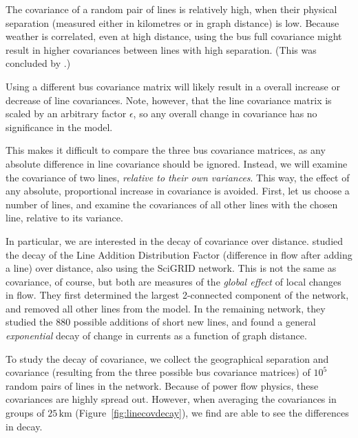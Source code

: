 \documentclass[main.tex]{subfiles}
\begin{document}
The covariance of a random pair of lines is relatively high, when their physical separation (measured either in kilometres or in graph distance) is low. Because weather is correlated, even at high distance, using the bus full covariance might result in higher covariances between lines with high separation. (This was concluded by \cite{Nesti2018emergentfailures}.) 

Using a different bus covariance matrix will likely result in a overall increase or decrease of line covariances. Note, however, that the line covariance matrix is scaled by an arbitrary factor $\epsilon$, so any overall change in covariance has no significance in the model. 

This makes it difficult to compare the three bus covariance matrices, as any absolute difference in line covariance should be ignored. Instead, we will examine the covariance of two lines, \emph{relative to their own variances}. This way, the effect of any absolute, proportional increase in covariance is avoided. First, let us choose a number of lines, and examine the covariances of all other lines with the chosen line, relative to its variance. 

In particular, we are interested in the decay of covariance over distance. \cite{Jung2016} studied the decay of the Line Addition Distribution Factor (difference in flow after adding a line) over distance, also using the SciGRID network. This is not the same as covariance, of course, but both are measures of the \emph{global effect} of local changes in flow. They first determined the largest 2-connected component of the network, and removed all other lines from the model. In the remaining network, they studied the 880 possible additions of short new lines, and found a general \emph{exponential} decay of change in currents as a function of graph distance.

To study the decay of covariance, we collect the geographical separation and covariance (resulting from the three possible bus covariance matrices) of $10^5$ random pairs of lines in the network. Because of power flow physics, these covariances are highly spread out. However, when averaging the covariances in groups of $25 \, \si{\kilo\metre}$ (Figure~\ref{fig:linecovdecay}), we find are able to see the differences in decay. 
\end{document}
